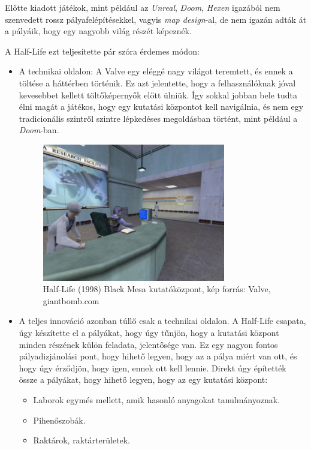\documentclass[]{thesis-ekf}
\theoremstyle{definition}
\begin{document}
	Előtte kiadott játékok, mint például az \emph{Unreal}, \emph{Doom}, \emph{Hexen} igazából nem szenvedett rossz pályafelépítésekkel, vagyis \emph{map design}-al, de nem igazán adták át a pályáik, hogy egy nagyobb világ részét képeznék.
	
	A Half-Life ezt teljesítette pár szóra érdemes módon:
	\begin{itemize}
		\item A technikai oldalon: A Valve egy eléggé nagy világot teremtett, és ennek a töltése a háttérben történik.
		Ez azt jelentette, hogy a felhasználóknak jóval kevesebbet kellett töltőképernyők előtt ülniük. Így sokkal jobban bele tudta élni magát a játékos, hogy egy kutatási központot kell navigálnia, és nem egy tradicionális szintről szintre lépkedéses megoldásban történt, mint például a \emph{Doom}-ban.
		
		\begin{figure}[!ht]
			\label{kep:hl2}
			\centering
			\includegraphics[width=8cm]{halflife2}
			\caption{Half-Life (1998) Black Mesa kutatóközpont, kép forrás: Valve, giantbomb.com\cite{pic-hl2}}
		\end{figure}
		
		\item A teljes innováció azonban túllő csak a technikai oldalon. A Half-Life csapata, úgy készítette el a pályákat, hogy úgy tűnjön, hogy a kutatási központ minden részének külön feladata, jelentősége van. Ez egy nagyon fontos pályadizjánolási pont, hogy hihető legyen, hogy az a pálya miért van ott, és hogy úgy érződjön, hogy igen, ennek ott kell lennie. Direkt úgy építették össze a pályákat, hogy hihető legyen, hogy az egy kutatási központ:
		\begin{itemize}
			\item Laborok egymés mellett, amik hasonló anyagokat tanulmányoznak.
			\item Pihenőszobák.
			\item Raktárok, raktárterületek.
		\end{itemize}
	\pagebreak
	\end{itemize}
	
\end{document}
